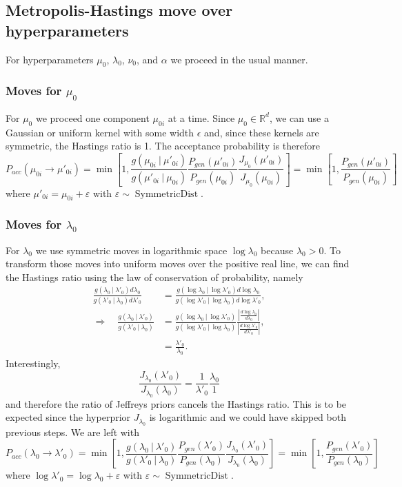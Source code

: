 \documentclass[11pt, oneside]{article}   	%
\begin{document}
\subsection{Metropolis-Hastings move over hyperparameters}
For hyperparameters $\mu_0$, $\lambda_0$, $\nu_0$, and $\alpha$ we proceed in the usual manner. 

\subsubsection{Moves for $\mu_0$}
For $\mu_0$ we proceed one component $\mu_{0i}$ at a time. Since $\mu_0\in\mathbb{R}^d$, we can use a Gaussian or uniform kernel with some width $\epsilon$ and, since these kernels are symmetric, the Hastings ratio is 1. The acceptance probability is therefore
$$P_{acc}(\mu_{0i}\rightarrow\mu'_{0i}) = \min\left[1, \frac{g(\mu_{0i}~\vert~\mu'_{0i})}{g(\mu'_{0i}~\vert~\mu_{0i})}\frac{P_{gen}(\mu'_{0i})}{P_{gen}(\mu_{0i})}\frac{J_{\mu_0}(\mu'_{0i})}{J_{\mu_0}(\mu_{0i})}\right] =  \min\left[1, \frac{P_{gen}(\mu'_{0i})}{P_{gen}(\mu_{0i})}\right]$$
where $\mu'_{0i} = \mu_{0i} + \varepsilon$ with $\varepsilon \sim\operatorname{SymmetricDist}$.

\subsubsection{Moves for $\lambda_0$}
For $\lambda_0$ we use symmetric moves in logarithmic space $\log\lambda_0$ because $\lambda_0 > 0$. To transform those moves into uniform moves over the positive real line, we can find the Hastings ratio using the law of conservation of probability, namely
\begin{equation}\begin{split}
\frac{g(\lambda_0~\vert~\lambda'_0) d\lambda_0}{g(\lambda'_0~\vert~\lambda_0)d\lambda'_0} &= \frac{g(\log\lambda_0~\vert~\log\lambda'_0) d\log\lambda_0}{g(\log\lambda'_0~\vert~\log\lambda_0)d\log\lambda'_0},\\
\Rightarrow\quad\frac{g(\lambda_0~\vert~\lambda'_0)}{g(\lambda'_0~\vert~\lambda_0)} &= \frac{g(\log\lambda_0~\vert~\log\lambda'_0)}{g(\log\lambda'_0~\vert~\log\lambda_0)} \frac{\left\vert\frac{d\log\lambda_0}{d\lambda_0}\right\vert}{\left\vert\frac{d\log\lambda'_0}{d\lambda'_0}\right\vert},\\
&= \frac{\lambda'_0}{\lambda_0}.
\end{split}\end{equation}
Interestingly,
$$\frac{J_{\lambda_0}(\lambda'_0)}{J_{\lambda_0}(\lambda_0)} = \frac{1}{\lambda'_0}\frac{\lambda_0}{1}$$
and therefore the ratio of Jeffreys priors cancels the Hastings ratio. This is to be expected since the hyperprior $J_{\lambda_0}$ is logarithmic and we could have skipped both previous steps. We are left with
$$P_{acc}(\lambda_0\rightarrow\lambda'_0) = \min\left[1, \frac{g(\lambda_{0}~\vert~\lambda'_{0})}{g(\lambda'_{0}~\vert~\lambda_{0})}\frac{P_{gen}(\lambda'_{0})}{P_{gen}(\lambda_{0})}\frac{J_{\lambda_0}(\lambda'_{0})}{J_{\lambda_0}(\lambda_{0})}\right] =  \min\left[1, \frac{P_{gen}(\lambda'_{0})}{P_{gen}(\lambda_{0})}\right]$$
where $\log\lambda'_0 = \log\lambda_0 + \varepsilon$ with $\varepsilon \sim\operatorname{SymmetricDist}$.
\end{document}
